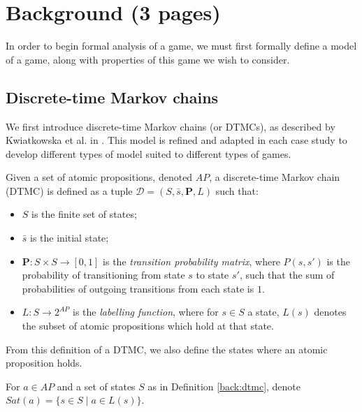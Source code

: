 
\chapter{Background (3 pages)}

In order to begin formal analysis of a game, we must first formally define a model of a game, along with properties of this game we wish to consider.

\section{Discrete-time Markov chains}
\label{back:stoc_game}

We first introduce discrete-time Markov chains (or DTMCs), as described by Kwiatkowska et al. in \cite{kwiatkowska_stochastic_2007}. This model is refined and adapted in each case study to develop different types of model suited to different types of games.

\begin{definition}
\label{back:dtmc}
    Given a set of atomic propositions, denoted $AP$, a discrete-time Markov chain (DTMC) is defined as a tuple $\mathcal{D} = (S, \bar{s}, \mathbf{P}, L)$ such that:

    \begin{itemize}
        \item $S$ is the finite set of states;
        \item $\bar{s}$ is the initial state;
        \item $\mathbf{P} : S \times S \rightarrow [0,1]$ is the \emph{transition probability matrix}, where $P(s, s')$ is the probability of transitioning from state $s$ to state $s'$, such that the sum of probabilities of outgoing transitions from each state is $1$.
        \item $L: S \rightarrow 2^{AP}$ is the \emph{labelling function}, where for $s \in S$ a state, $L(s)$ denotes the subset of atomic propositions which hold at that state.
    \end{itemize}

\end{definition}

From this definition of a DTMC, we also define the states where an atomic proposition holds.

\begin{definition}
\label{back:sat}

    For $a \in AP$ and a set of states $S$ as in Definition \ref{back:dtmc}, denote $Sat(a) = \{s \in S \mid a \in L(s)\}$.

\end{definition}


